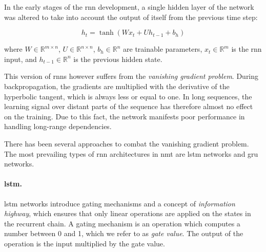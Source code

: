 In the early stages of the \gls{rnn} development, a single hidden layer of the
network was altered to take into account the output of itself from the previous
time step:

%

\begin{equation}
  h_t = \tanh ( W x_t + U h_{t-1} + b_h ) \label{eq:vanilla-rnn}
\end{equation}

\noindent
where $W \in \mathbb{R}^{m \times n}$, $U \in \mathbb{R}^{n \times n}$, $b_h \in \mathbb{R}^{n}$ are trainable parameters, $x_t \in \mathbb{R}^{m}$ is the \gls{rnn} input, and $h_{t-1} \in \mathbb{R}^{n}$ is the previous hidden state.

This version of \glspl{rnn} however suffers from the \emph{vanishing gradient problem}. During backpropagation, the gradients are multiplied with the
derivative of the hyperbolic tangent, which is always less or equal to one. In long sequences,
the learning signal over distant parts of the sequence has therefore almost no 
effect on the training. Due to this fact, the network 
manifests poor performance in handling long-range dependencies.

There has been several approaches to combat the vanishing gradient problem.
The most prevailing types of \gls{rnn} architectures in \gls{nmt} are \gls{lstm} networks and \gls{gru} networks.

\paragraph{\acrshort{lstm}.} \acrlong{lstm} networks \citep{hochreiter1997long}
introduce gating mechanisms and a concept of \emph{information highway}, which ensures that
only linear operations are applied on the states in the recurrent chain. A gating mechanism is
an operation which computes a number between 0 and 1, which we refer to as \emph{gate value}.
The output of the operation is the input multiplied by the gate value.

